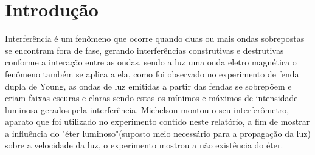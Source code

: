 \section{Introdução}
Interferência é um fenômeno que ocorre quando duas ou mais ondas sobrepostas se encontram fora de fase, gerando interferências construtivas e destrutivas conforme a interação entre as ondas, sendo a luz uma onda eletro magnética o fenômeno também se aplica a ela, como foi observado no experimento de fenda dupla de Young, as ondas de luz emitidas a partir das fendas se sobrepõem e criam faixas escuras e claras sendo estas os mínimos e máximos de intensidade luminosa gerados pela interferência. Michelson montou o seu interferômetro, aparato que foi utilizado no experimento contido neste relatório, a fim de mostrar a influência do "éter luminoso"(suposto meio necessário para a propagação da luz) sobre a velocidade da luz, o experimento mostrou a não existência do éter. 
